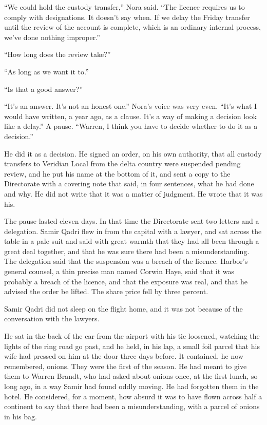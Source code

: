 ``We could hold the custody transfer,'' Nora said. ``The licence requires us to comply with designations. It doesn't say when. If we delay the Friday transfer until the review of the account is complete, which is an ordinary internal process, we've done nothing improper.''

``How long does the review take?''

``As long as we want it to.''

``Is that a good answer?''

``It's an answer. It's not an honest one.'' Nora's voice was very even. ``It's what I would have written, a year ago, as a clause. It's a way of making a decision look like a delay.'' A pause. ``Warren, I think you have to decide whether to do it as a decision.''

He did it as a decision. He signed an order, on his own authority, that all custody transfers to Veridian Local from the delta country were suspended pending review, and he put his name at the bottom of it, and sent a copy to the Directorate with a covering note that said, in four sentences, what he had done and why. He did not write that it was a matter of judgment. He wrote that it was his.

The pause lasted eleven days. In that time the Directorate sent two letters and a delegation. Samir Qadri flew in from the capital with a lawyer, and sat across the table in a pale suit and said with great warmth that they had all been through a great deal together, and that he was sure there had been a misunderstanding. The delegation said that the suspension was a breach of the licence. Harbor's general counsel, a thin precise man named Corwin Haye, said that it was probably a breach of the licence, and that the exposure was real, and that he advised the order be lifted. The share price fell by three percent.

\scenebreak
\noindent Samir Qadri did not sleep on the flight home, and it was not because of the conversation with the lawyers.

He sat in the back of the car from the airport with his tie loosened, watching the lights of the ring road go past, and he held, in his lap, a small foil parcel that his wife had pressed on him at the door three days before. It contained, he now remembered, onions. They were the first of the season. He had meant to give them to Warren Brandt, who had asked about onions once, at the first lunch, so long ago, in a way Samir had found oddly moving. He had forgotten them in the hotel. He considered, for a moment, how absurd it was to have flown across half a continent to say that there had been a misunderstanding, with a parcel of onions in his bag.

